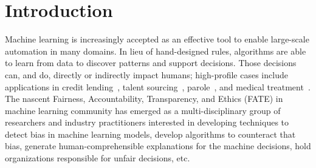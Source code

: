 \section{Introduction}
\label{sec:intro}


Machine learning is increasingly accepted as an effective tool to enable large-scale automation in many domains. In lieu of hand-designed rules, algorithms are able to learn from data to discover patterns and support decisions. %
%
Those decisions can, and do, directly or indirectly impact humans; high-profile cases include applications in credit lending~\cite{credit-risk-ml}, talent sourcing~\cite{hiring-ml}, parole~\cite{parole-ml}, and medical treatment~\cite{medical-treatment-ml}.
%
The nascent Fairness, Accountability, Transparency, and Ethics (FATE) in machine learning community has emerged as a multi-disciplinary group of researchers and industry practitioners interested in developing techniques to detect bias in machine learning models, develop algorithms to counteract that bias, generate human-comprehensible explanations for the machine decisions, hold organizations responsible for unfair decisions, etc.   %

